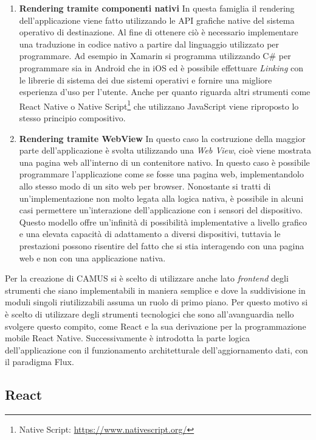 \begin{enumerate}
	\item \textbf{Rendering tramite componenti nativi} In questa famiglia il rendering dell'applicazione viene fatto utilizzando le API grafiche native del sistema operativo di destinazione.
	Al fine di ottenere ciò è necessario implementare una traduzione in codice nativo a partire dal linguaggio utilizzato per programmare. Ad esempio in Xamarin si programma utilizzando C\# per programmare sia in Android che in iOS ed è possibile effettuare \emph{Linking} con le librerie di sistema dei due sistemi operativi e fornire una migliore esperienza d'uso per l'utente. Anche per quanto riguarda altri strumenti come React Native o Native Script\footnote{Native Script: \url{https://www.nativescript.org/}} che utilizzano JavaScript viene riproposto lo stesso principio compositivo.
	\item \textbf{Rendering tramite WebView} In questo caso la costruzione della maggior parte dell'applicazione è svolta utilizzando una \emph{Web View}, cioè viene mostrata una pagina web all'interno di un contenitore nativo.
	In questo caso è possibile programmare l'applicazione come se fosse una pagina web, implementandolo allo stesso modo di un sito web per browser. Nonostante si tratti di un'implementazione non molto legata alla logica nativa, è possibile in alcuni casi permettere un'interazione dell'applicazione con i sensori del dispositivo.
	Questo modello offre un'infinità di possibilità implementative a livello grafico e una elevata capacità di adattamento a diversi dispositivi, tuttavia le prestazioni possono risentire del fatto che si stia interagendo con una pagina web e non con una applicazione nativa.
\end{enumerate}

Per la creazione di CAMUS si è scelto di utilizzare anche lato \emph{frontend} degli strumenti che siano implementabili in maniera semplice e dove la suddivisione in moduli singoli riutilizzabili assuma un ruolo di primo piano. Per questo motivo si è scelto di utilizzare degli strumenti tecnologici che sono all'avanguardia nello svolgere questo compito, come React e la sua derivazione per la programmazione mobile React Native. Successivamente è introdotta la parte logica dell'applicazione con il funzionamento architetturale dell'aggiornamento dati, con il paradigma Flux.

\subsection{React}\label{sec:react}

